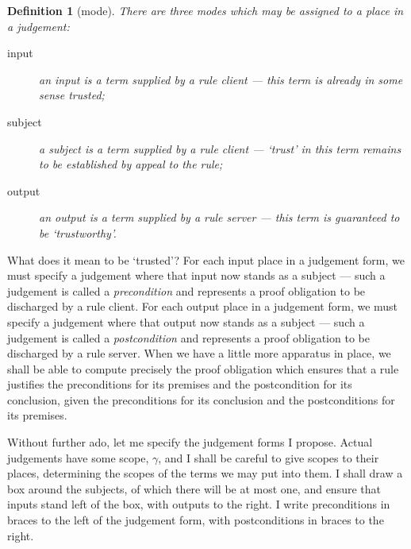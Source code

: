 \documentclass{jfp1}
\newtheorem{definition}[theorem]{Definition}
\begin{document}
\begin{definition}[mode]
  There are three modes which may be assigned to a place in a judgement:
  \begin{description}
  \item[input] an input is a term supplied by a rule client ---
    this term is already in some sense trusted;
  \item[subject] a subject is a term supplied by a rule client ---
    `trust' in this term remains to be established by appeal to the rule;
  \item[output] an output is a term supplied by a rule server ---
    this term is guaranteed to be `trustworthy'.
  \end{description}
\end{definition}

What does it mean to be `trusted'? For each input place in a judgement
form, we must specify a judgement where that input now stands as a
subject --- such a judgement is called a \emph{precondition} and
represents a proof obligation to be discharged by a rule client. For
each output place in a judgement form, we must specify a judgement
where that output now stands as a subject --- such a judgement is
called a \emph{postcondition} and represents a proof obligation to be
discharged by a rule server. When we have a little more apparatus in
place, we shall be able to compute precisely the proof obligation which ensures
that a rule justifies the preconditions for its premises and the postcondition
for its conclusion, given the preconditions for its conclusion and the postconditions
for its premises.

Without further ado, let me specify the judgement forms I
propose. Actual judgements have some scope, $\gamma$, and I shall be
careful to give scopes to their places, determining the scopes of the
terms we may put into them. I shall draw a box around the
subjects, of which there will be at most one, and ensure that inputs
stand left of the box, with outputs to the right.  I write
preconditions in braces to the left of the judgement form, with
postconditions in braces to the right.
\end{document}
